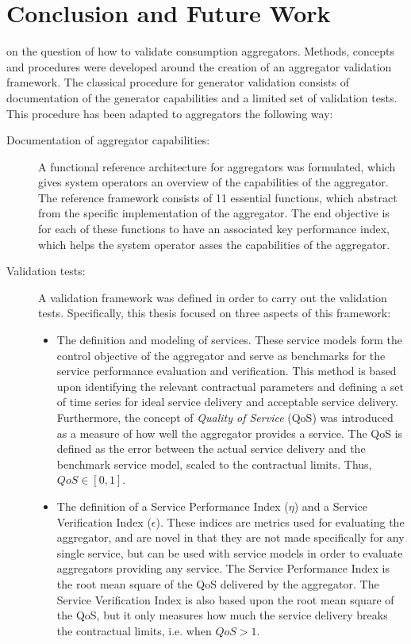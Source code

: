 \chapter{Conclusion and Future Work}
\label{cha:conclusion}
 on the question of how to validate consumption aggregators. Methods, concepts and procedures were developed around the creation of an aggregator validation framework. The classical procedure for generator validation consists of documentation of the generator capabilities and a limited set of validation tests. This procedure has been adapted to aggregators the following way:
\begin{description}
	\item[Documentation of aggregator capabilities:] A functional reference architecture for aggregators was formulated, which gives system operators an overview of the capabilities of the aggregator. The reference framework consists of 11 essential functions, which abstract from the specific implementation of the aggregator. The end objective is for each of these functions to have an associated key performance index, which helps the system operator asses the capabilities of the aggregator.
	\item[Validation tests:] A validation framework was defined in order to carry out the validation tests. Specifically, this thesis focused on three aspects of this framework:
		\begin{itemize}
			\item The definition and modeling of services. These service models form the control objective of the aggregator and serve as benchmarks for the service performance evaluation and verification. This method is based upon identifying the relevant contractual parameters and defining a set of time series for ideal service delivery and acceptable service delivery. Furthermore, the concept of \emph{Quality of Service} (QoS) was introduced as a measure of how well the aggregator provides a service. The QoS is defined as the error between the actual service delivery and the benchmark service model, scaled to the contractual limits. Thus, $QoS \in [0,1]$.
			\item The definition of a Service Performance Index ($\eta$) and a Service Verification Index ($\epsilon$). These indices are metrics used for evaluating the aggregator, and are novel in that they are not made specifically for any single service, but can be used with service models in order to evaluate aggregators providing any service. The Service Performance Index is the root mean square of the QoS delivered by the aggregator. The Service Verification Index is also based upon the root mean square of the QoS, but it only measures how much the service delivery breaks the contractual limits, i.e. when $QoS > 1$.

\end{itemize}
\end{description}
